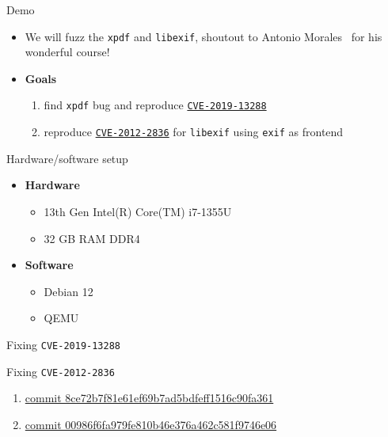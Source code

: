 \documentclass[xcolor=dvipsnames, 12pt]{beamer}
\begin{document}
\begin{frame}{Demo}
        \begin{itemize}
                \item We will fuzz the \texttt{xpdf} and \texttt{libexif}, shoutout to Antonio Morales~\cite{morales} for his wonderful course!
                \item \textbf{Goals}
                        \begin{enumerate}
                                \item find \texttt{xpdf} bug and reproduce \href{https://www.cvedetails.com/cve/CVE-2019-13288/}{\texttt{CVE-2019-13288}}
                                \item reproduce \href{https://cve.mitre.org/cgi-bin/cvename.cgi?name=CVE-2012-2836}{\texttt{CVE-2012-2836}} for \texttt{libexif} using \texttt{exif} as frontend
                        \end{enumerate}
        \end{itemize}
\end{frame}

\begin{frame}{Hardware/software setup}
        \begin{itemize}
                \item \textbf{Hardware}
                        \begin{itemize}
                                \item 13th Gen Intel(R) Core(TM) i7-1355U
                                \item 32 GB RAM DDR4
                        \end{itemize}
                \item \textbf{Software}
                        \begin{itemize}
                                \item Debian 12
                                \item QEMU
                        \end{itemize}
        \end{itemize}
\end{frame}

\begin{frame}{Fixing \texttt{CVE-2019-13288}}
        
        
\end{frame}

\begin{frame}{Fixing \texttt{CVE-2012-2836}}
        \begin{enumerate}
                \item \href{https://github.com/libexif/libexif/commit/8ce72b7f81e61ef69b7ad5bdfeff1516c90fa361}{commit 8ce72b7f81e61ef69b7ad5bdfeff1516c90fa361}
                \item \href{https://github.com/libexif/libexif/commit/00986f6fa979fe810b46e376a462c581f9746e06}{commit 00986f6fa979fe810b46e376a462c581f9746e06}
        \end{enumerate}
\end{frame}
\end{document}
